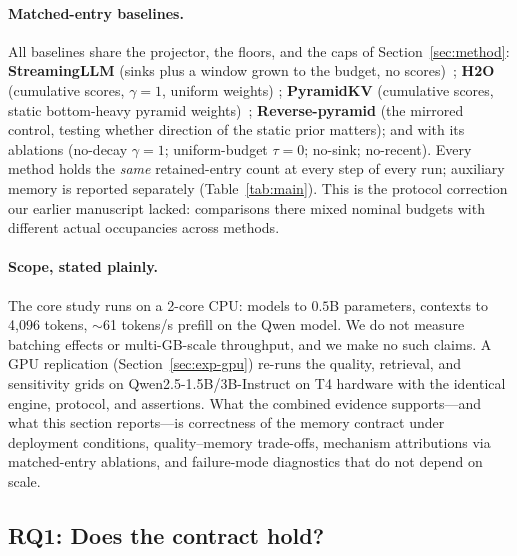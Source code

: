\paragraph{Matched-entry baselines.}
All baselines share the projector, the floors, and the caps of
Section~\ref{sec:method}: \textbf{StreamingLLM} (sinks plus a window
grown to the budget, no scores)~\cite{xiao2024streamingllm};
\textbf{H2O} (cumulative scores, $\gamma=1$, uniform weights)
\cite{zhang2023h2o}; \textbf{PyramidKV} (cumulative scores, static
bottom-heavy pyramid weights)~\cite{cai2024pyramidkv};
\textbf{Reverse-pyramid} (the mirrored control, testing whether direction
of the static prior matters); and \sage{} with its ablations
(no-decay $\gamma=1$; uniform-budget $\tau=0$; no-sink; no-recent).
Every method holds the \emph{same} retained-entry count at every step of
every run; auxiliary memory is reported separately
(Table~\ref{tab:main}). This is the protocol correction our earlier
manuscript lacked: comparisons there mixed nominal budgets with different
actual occupancies across methods.

\paragraph{Scope, stated plainly.}
The core study runs on a 2-core CPU: models to $0.5$B parameters, contexts
to 4{,}096 tokens, $\sim$61 tokens/s prefill on the Qwen model. We do not
measure batching effects or multi-GB-scale throughput, and we make no
such claims. A GPU replication (Section~\ref{sec:exp-gpu}) re-runs the
quality, retrieval, and sensitivity grids on Qwen2.5-1.5B/3B-Instruct on
T4 hardware with the identical engine, protocol, and assertions. What the
combined evidence supports---and what this section reports---is
correctness of the memory contract under deployment
conditions, quality--memory trade-offs, mechanism attributions via
matched-entry ablations, and failure-mode diagnostics that do not depend
on scale.

\subsection{RQ1: Does the contract hold?}\label{sec:exp-compliance}

